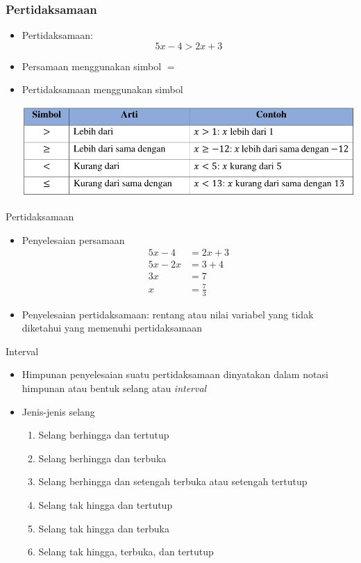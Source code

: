 \documentclass[pdflatex,compress,mathserif]{beamer}
\begin{document}
		\begin{frame}
			\frametitle{Pertidaksamaan}
			\begin{itemize}
				\item Pertidaksamaan:
				\begin{equation}
					5x - 4 > 2x + 3
				\end{equation}
				\item Persamaan menggunakan simbol $ = $
				\item Pertidaksamaan menggunakan simbol
				\begin{center}
					\includegraphics[width=\linewidth]{pict/01}
				\end{center}
			\end{itemize}
		\end{frame}
	
		\begin{frame}{Pertidaksamaan}
			\begin{itemize}
				\item Penyelesaian persamaan
				\begin{align*}
					5x - 4 &= 2x + 3\\
					5x - 2x &= 3 + 4\\
					3x &= 7\\
					x &= \frac{7}{3}
				\end{align*}
				\item Penyelesaian pertidaksamaan: rentang atau nilai variabel yang tidak diketahui yang memenuhi pertidaksamaan
			\end{itemize}
		\end{frame}
	
		\begin{frame}{Interval}
			\begin{itemize}
				\item Himpunan penyelesaian suatu pertidaksamaan dinyatakan dalam notasi himpunan atau bentuk selang atau \textit{interval}
				\item Jenis-jenis selang
				\begin{enumerate}
					\item Selang berhingga dan tertutup
					\item Selang berhingga dan terbuka
					\item Selang berhingga dan setengah terbuka atau setengah tertutup
					\item Selang tak hingga dan tertutup
					\item Selang tak hingga dan terbuka
					\item Selang tak hingga, terbuka, dan tertutup
				\end{enumerate}
			\end{itemize}
		\end{frame}
	
\end{document}
